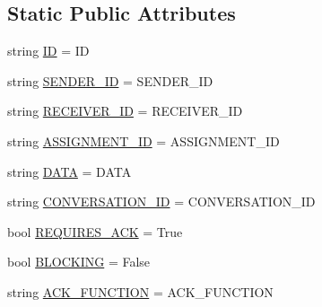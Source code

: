 \subsection*{Static Public Attributes}
\begin{DoxyCompactItemize}
\item 
string \hyperlink{classparlai_1_1mturk_1_1core_1_1test_1_1test__socket__manager_1_1TestPacket_a169f4f920f4e11cea781cc5d486958e0}{ID} = \textquotesingle{}ID\textquotesingle{}
\item 
string \hyperlink{classparlai_1_1mturk_1_1core_1_1test_1_1test__socket__manager_1_1TestPacket_a03be727b0835ae15c8521720d07c0944}{S\+E\+N\+D\+E\+R\+\_\+\+ID} = \textquotesingle{}S\+E\+N\+D\+E\+R\+\_\+\+ID\textquotesingle{}
\item 
string \hyperlink{classparlai_1_1mturk_1_1core_1_1test_1_1test__socket__manager_1_1TestPacket_ae9629f7e0281542152ec88977cde90d4}{R\+E\+C\+E\+I\+V\+E\+R\+\_\+\+ID} = \textquotesingle{}R\+E\+C\+E\+I\+V\+E\+R\+\_\+\+ID\textquotesingle{}
\item 
string \hyperlink{classparlai_1_1mturk_1_1core_1_1test_1_1test__socket__manager_1_1TestPacket_ad6144847ca4ea713aac5cba8d5d79a6f}{A\+S\+S\+I\+G\+N\+M\+E\+N\+T\+\_\+\+ID} = \textquotesingle{}A\+S\+S\+I\+G\+N\+M\+E\+N\+T\+\_\+\+ID\textquotesingle{}
\item 
string \hyperlink{classparlai_1_1mturk_1_1core_1_1test_1_1test__socket__manager_1_1TestPacket_a451a4ee4b706dae3aa7f05c7fb8a8de2}{D\+A\+TA} = \textquotesingle{}D\+A\+TA\textquotesingle{}
\item 
string \hyperlink{classparlai_1_1mturk_1_1core_1_1test_1_1test__socket__manager_1_1TestPacket_a3896a30cb7b5dfd6d93a7fb6716d4134}{C\+O\+N\+V\+E\+R\+S\+A\+T\+I\+O\+N\+\_\+\+ID} = \textquotesingle{}C\+O\+N\+V\+E\+R\+S\+A\+T\+I\+O\+N\+\_\+\+ID\textquotesingle{}
\item 
bool \hyperlink{classparlai_1_1mturk_1_1core_1_1test_1_1test__socket__manager_1_1TestPacket_a6440aada1968e3b1ac6143b514fca34d}{R\+E\+Q\+U\+I\+R\+E\+S\+\_\+\+A\+CK} = True
\item 
bool \hyperlink{classparlai_1_1mturk_1_1core_1_1test_1_1test__socket__manager_1_1TestPacket_acd98997d8c77211f132bbb1666d91577}{B\+L\+O\+C\+K\+I\+NG} = False
\item 
string \hyperlink{classparlai_1_1mturk_1_1core_1_1test_1_1test__socket__manager_1_1TestPacket_a9a2b210715d16703e52da66668621561}{A\+C\+K\+\_\+\+F\+U\+N\+C\+T\+I\+ON} = \textquotesingle{}A\+C\+K\+\_\+\+F\+U\+N\+C\+T\+I\+ON\textquotesingle{}
\end{DoxyCompactItemize}


